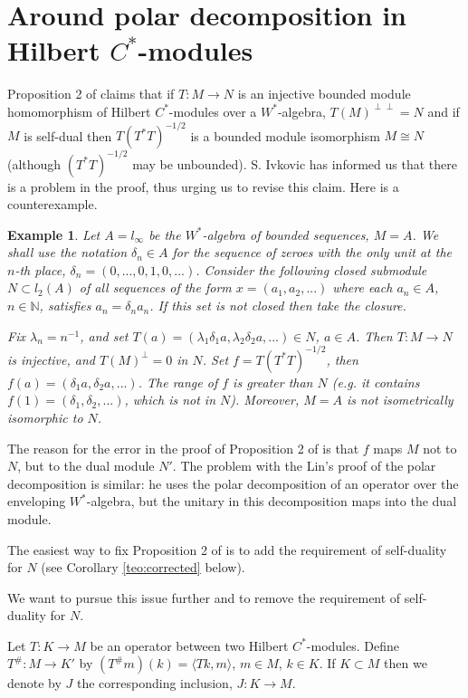 \documentclass[12pt]{amsart}
\newtheorem{ex}[teo]{Example}
\begin{document}
\section{Around polar decomposition in Hilbert $C^*$-modules}


 Proposition 2 of \cite{FrTroFA} claims that if $T:M\to N$ is an injective bounded module homomorphism of Hilbert $C^*$-modules over a $W^*$-algebra, $T(M)^{\perp\perp}=N$ and if $M$ is self-dual then $T(T^*T)^{-1/2}$ is a bounded module isomorphism $M\cong N$  (although $(T^*T)^{-1/2}$ may be unbounded). S. Ivkovic has informed us that there is a problem in the proof, thus urging us to revise this claim. Here is a counterexample.

\begin{ex}\rm
Let $A=l_\infty$ be the $W^*$-algebra of bounded sequences, $M=A$. We shall use the notation $\delta_n\in A$ for the sequence of zeroes with the only unit at the $n$-th place, $\delta_n=(0,...,0,1,0,...)$. Consider the following closed submodule $N\subset l_2(A)$ of all sequences of the form $x=(a_1,a_2,...)$ where each $a_n\in A$, $n\in\mathbb N$, satisfies $a_n=\delta_n a_n$. If this set is not closed then take the closure. 
 
Fix $\lambda_n=n^{-1}$, and set $T(a)=(\lambda_1\delta_1 a,\lambda_2\delta_2 a,...)\in N$, $a\in A$. Then $T:M\to N$ is injective, and $T(M)^\perp=0$ in $N$. Set $f=T(T^*T)^{-1/2}$, then $f(a)=(\delta_1 a,\delta_2 a,...)$.
The range of $f$ is greater than $N$ (e.g. it contains $f(1)=(\delta_1,\delta_2,...)$, which is not in $N$). Moreover, $M=A$ is not isometrically isomorphic to $N$.
\end{ex}
  
The reason for the error in the proof of Proposition 2 of \cite{FrTroFA} is that $f$ maps $M$ not to $N$, but to the dual module $N'$. The problem with the Lin's proof of the polar decomposition \cite{Lin} is similar: he uses the polar decomposition of an operator over the enveloping $W^*$-algebra, but the unitary in this decomposition maps into the dual module.
 
The easiest way to fix  Proposition 2 of \cite{FrTroFA} is to add the requirement of self-duality for $N$
(see Corollary \ref{teo:corrected} below).



We want to pursue this issue further and to remove the requirement of self-duality for $N$.
 
Let $T:K\to M$ be an operator between two Hilbert $C^*$-modules. Define $T^\#:M\to K'$ by $(T^\#m)(k)=\langle Tk,m\rangle$, $m\in M$, $k\in K$. If $K\subset M$ then we denote by $J$ the corresponding inclusion, $J:K\to M$.
\end{document}
